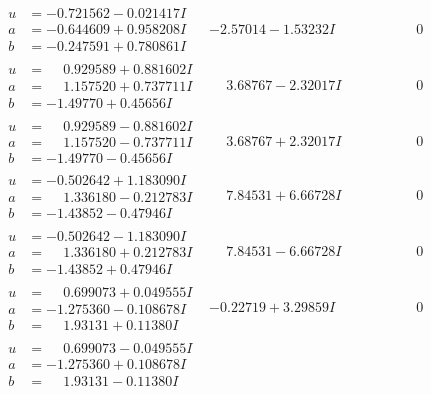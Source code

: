 \documentclass[1p]{elsarticle_modified}
\theoremstyle{definition}
\begin{document}
$$\begin{array}{c|c|c}
\begin{aligned}
u &= -0.721562 - 0.021417 I \\
a &= -0.644609 + 0.958208 I \\
b &= -0.247591 + 0.780861 I\end{aligned}
 & -2.57014 - 1.53232 I & \phantom{-0.000000 } 0 \\ \hline\begin{aligned}
u &= \phantom{-}0.929589 + 0.881602 I \\
a &= \phantom{-}1.157520 + 0.737711 I \\
b &= -1.49770 + 0.45656 I\end{aligned}
 & \phantom{-}3.68767 - 2.32017 I & \phantom{-0.000000 } 0 \\ \hline\begin{aligned}
u &= \phantom{-}0.929589 - 0.881602 I \\
a &= \phantom{-}1.157520 - 0.737711 I \\
b &= -1.49770 - 0.45656 I\end{aligned}
 & \phantom{-}3.68767 + 2.32017 I & \phantom{-0.000000 } 0 \\ \hline\begin{aligned}
u &= -0.502642 + 1.183090 I \\
a &= \phantom{-}1.336180 - 0.212783 I \\
b &= -1.43852 - 0.47946 I\end{aligned}
 & \phantom{-}7.84531 + 6.66728 I & \phantom{-0.000000 } 0 \\ \hline\begin{aligned}
u &= -0.502642 - 1.183090 I \\
a &= \phantom{-}1.336180 + 0.212783 I \\
b &= -1.43852 + 0.47946 I\end{aligned}
 & \phantom{-}7.84531 - 6.66728 I & \phantom{-0.000000 } 0 \\ \hline\begin{aligned}
u &= \phantom{-}0.699073 + 0.049555 I \\
a &= -1.275360 - 0.108678 I \\
b &= \phantom{-}1.93131 + 0.11380 I\end{aligned}
 & -0.22719 + 3.29859 I & \phantom{-0.000000 } 0 \\ \hline\begin{aligned}
u &= \phantom{-}0.699073 - 0.049555 I \\
a &= -1.275360 + 0.108678 I \\
b &= \phantom{-}1.93131 - 0.11380 I\end{aligned}

\end{array}$$
\end{document}
